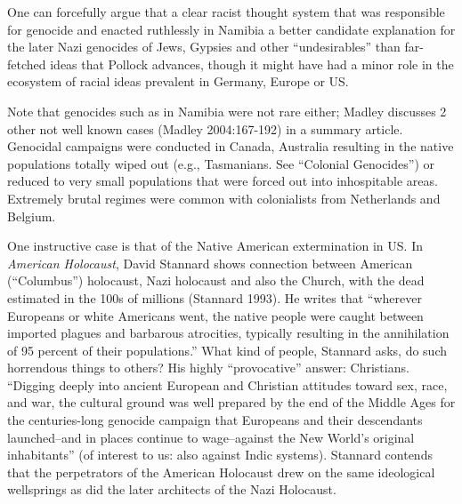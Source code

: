 One can forcefully argue that a clear racist thought system that was responsible for genocide and enacted ruthlessly in Namibia a better candidate explanation for the later Nazi genocides of  Jews, Gypsies and other “undesirables” than far-fetched ideas that Pollock advances, though it might have had a minor role in the ecosystem of racial ideas prevalent in Germany, Europe or US.

Note that genocides such as in Namibia were not rare either; Madley discusses 2 other not well known cases (Madley 2004:167-192) in a summary article. Genocidal campaigns were conducted in Canada, Australia resulting in the native populations totally wiped out (e.g., Tasmanians. See “Colonial Genocides”) or reduced to very small populations that were forced out into inhospitable areas.  Extremely brutal regimes were common with colonialists from Netherlands and Belgium.

One instructive case is that of the Native American extermination in US\@.  In {\sl American Holocaust}, David Stannard shows connection between American (“Columbus”) holocaust, Nazi holocaust and also the Church, with the dead estimated in the 100s of millions (Stannard 1993). He writes that “wherever Europeans or white Americans went, the native people were caught between imported plagues and barbarous atrocities, typically resulting in the annihilation of 95 percent of their populations.” What kind of people, Stannard asks, do such horrendous things to others? His highly “provocative” answer: Christians. “Digging deeply into ancient European and Christian attitudes toward sex, race, and war, the cultural ground was well prepared by the end of the Middle Ages for the centuries-long genocide campaign that Europeans and their descendants launched--and in places continue to wage--against the New World's original inhabitants” (of interest to us: also against Indic systems). Stannard contends that the perpetrators of the American Holocaust drew on the same ideological wellsprings as did the later architects of the Nazi Holocaust.

